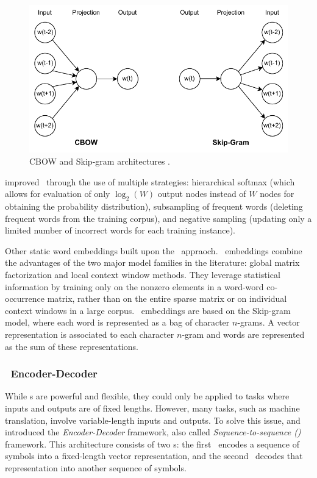 \begin{figure}[h]
    \centering
    \includegraphics[width=\columnwidth]{chapter2/pictures/word2vec.pdf}
    \caption{CBOW and Skip-gram architectures \citep{mikolov2013efficient}.}
    \label{fig:word2vec}
\end{figure}

\citet{mikolov2013distributed} improved \wvec\ through the use of multiple strategies: hierarchical softmax (which allows for evaluation of only $\log_2(W)$ output nodes instead of $W$ nodes for obtaining the probability distribution), subsampling of frequent words (deleting frequent words from the training corpus), and negative sampling (updating only a limited number of incorrect words for each training instance).

Other static word embeddings built upon the \wvec\ appraoch. \glove\ embeddings \citep{pennington2014glove} combine the advantages of the two major model
families in the literature: global matrix factorization and local context window
methods. They leverage statistical information by training only on the nonzero elements in a word-word co-occurrence matrix, rather than on the entire sparse matrix or on individual context windows in a large corpus. \ftext\ embeddings \citep{bojanowski2017enriching} are based on the Skip-gram model, where each word is represented as a bag of character $n$-grams. A vector representation is associated to each character $n$-gram and words are represented as the sum of these representations. 

\subsubsection{\rnn\ Encoder-Decoder}
While {\rnn}s are powerful and flexible, they could only be applied to tasks where inputs and outputs are of fixed lengths. However, many {\nlp} tasks, such as machine translation, involve variable-length inputs and outputs. To solve this issue, \citet{cho2014learning} and \citet{sutskever2014sequence} introduced the \emph{Encoder-Decoder} framework, also called \emph{Sequence-to-sequence (\seqseq)} framework. This architecture consists of two \rnn s: the first \rnn\ encodes a sequence of symbols into a fixed-length vector representation, and the second \rnn\ decodes that representation into another sequence of symbols.


